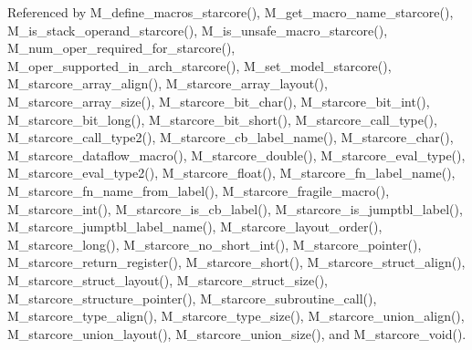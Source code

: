 Referenced by M\_\-define\_\-macros\_\-starcore(), M\_\-get\_\-macro\_\-name\_\-starcore(), M\_\-is\_\-stack\_\-operand\_\-starcore(), M\_\-is\_\-unsafe\_\-macro\_\-starcore(), M\_\-num\_\-oper\_\-required\_\-for\_\-starcore(), M\_\-oper\_\-supported\_\-in\_\-arch\_\-starcore(), M\_\-set\_\-model\_\-starcore(), M\_\-starcore\_\-array\_\-align(), M\_\-starcore\_\-array\_\-layout(), M\_\-starcore\_\-array\_\-size(), M\_\-starcore\_\-bit\_\-char(), M\_\-starcore\_\-bit\_\-int(), M\_\-starcore\_\-bit\_\-long(), M\_\-starcore\_\-bit\_\-short(), M\_\-starcore\_\-call\_\-type(), M\_\-starcore\_\-call\_\-type2(), M\_\-starcore\_\-cb\_\-label\_\-name(), M\_\-starcore\_\-char(), M\_\-starcore\_\-dataflow\_\-macro(), M\_\-starcore\_\-double(), M\_\-starcore\_\-eval\_\-type(), M\_\-starcore\_\-eval\_\-type2(), M\_\-starcore\_\-float(), M\_\-starcore\_\-fn\_\-label\_\-name(), M\_\-starcore\_\-fn\_\-name\_\-from\_\-label(), M\_\-starcore\_\-fragile\_\-macro(), M\_\-starcore\_\-int(), M\_\-starcore\_\-is\_\-cb\_\-label(), M\_\-starcore\_\-is\_\-jumptbl\_\-label(), M\_\-starcore\_\-jumptbl\_\-label\_\-name(), M\_\-starcore\_\-layout\_\-order(), M\_\-starcore\_\-long(), M\_\-starcore\_\-no\_\-short\_\-int(), M\_\-starcore\_\-pointer(), M\_\-starcore\_\-return\_\-register(), M\_\-starcore\_\-short(), M\_\-starcore\_\-struct\_\-align(), M\_\-starcore\_\-struct\_\-layout(), M\_\-starcore\_\-struct\_\-size(), M\_\-starcore\_\-structure\_\-pointer(), M\_\-starcore\_\-subroutine\_\-call(), M\_\-starcore\_\-type\_\-align(), M\_\-starcore\_\-type\_\-size(), M\_\-starcore\_\-union\_\-align(), M\_\-starcore\_\-union\_\-layout(), M\_\-starcore\_\-union\_\-size(), and M\_\-starcore\_\-void().